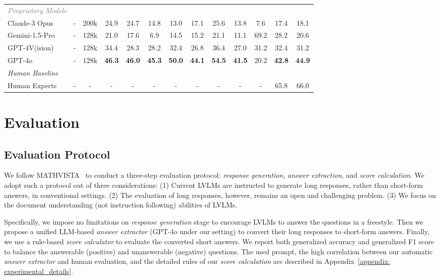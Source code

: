 \begin{table}[!htbp]
{\begin{tabular}{l cc|ccccc|ccc|cc}
    \textcolor{gray}{\textit{Proprietary Models}} \\
    Claude-3 Opus~\cite{claude3} & - & 200k & 24.9 & 24.7 & 14.8 & 13.0 & 17.1 & 25.6 & 13.8  & 7.6 & 17.4 & 18.1 \\
    Gemini-1.5-Pro~\cite{geminiteam2024gemini} & - & 128k & 21.0 & 17.6 & 6.9 & 14.5 & 15.2 & 21.1 & 11.1 &  \colorbox{secondBest}{69.2} & 28.2 & 20.6 \\
    GPT-4V(ision)~\cite{openai2024gpt4} & - & 128k & 34.4 & 28.3 & 28.2 & 32.4 & \colorbox{secondBest}{26.8} & \colorbox{secondBest}{36.4} & 27.0 & 31.2 & \colorbox{secondBest}{32.4} & \colorbox{secondBest}{31.2} \\
    GPT-4o~\cite{gpt4o} & - & 128k & \colorbox{firstBest}{\textbf{46.3}} & \colorbox{firstBest}{\textbf{46.0}} & \colorbox{firstBest}{\textbf{45.3}} & \colorbox{firstBest}{\textbf{50.0}} & \colorbox{firstBest}{\textbf{44.1}} & \colorbox{firstBest}{\textbf{54.5}} & \colorbox{firstBest}{\textbf{41.5}} & 20.2 & \colorbox{firstBest}{\textbf{42.8}} & \colorbox{firstBest}{\textbf{44.9}} \\
    \bottomrule
    \multicolumn{13}{l}{\hfill \textit{Human Baseline}} \\
    \midrule
    Human Experts & - & -  & - & -  & -  & -  & -  &-  & -  & - & 65.8 & 66.0 \\
    \bottomrule
    \end{tabular}
    }
\end{table}

\section{Evaluation}\label{sec:evaluation}

\subsection{Evaluation Protocol}
We follow MATHVISTA~\cite{lu2024mathvista} to conduct a three-step evaluation protocol: \textit{response generation}, \textit{answer extraction}, and \textit{score calculation}. We adopt such a protocol out of three considerations: (1) Current LVLMs are instructed to generate long responses, rather than short-form answers, in conventional settings. (2) The evaluation of long responses, however, remains an open and challenging problem. (3) We focus on the document understanding (not instruction following) abilities of LVLMs.

Specifically, we impose no limitations on \textit{response generation} stage to encourage LVLMs to answer the questions in a freestyle. Then we propose a unified LLM-based \textit{answer extractor} (GPT-4o under our setting) to convert their long responses to short-form answers. Finally, we use a rule-based \textit{score calculator} to evaluate the converted short answers. We report both generalized accuracy and generalized F1 score to balance the answerable (positive) and unanswerable (negative) questions. The used prompt, the high correlation between our automatic \textit{answer extractor} and human evaluation, and the detailed rules of our \textit{score calculation} are described in Appendix~\ref{appendix: experimental_details}.


